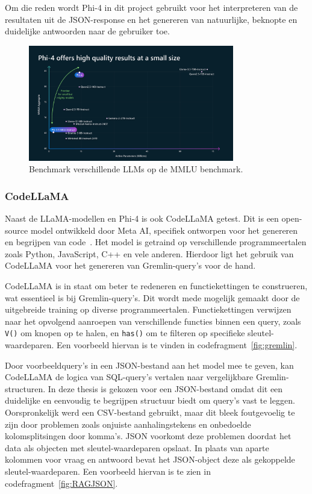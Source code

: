 Om die reden wordt Phi-4 in dit project gebruikt voor het interpreteren van de resultaten uit de JSON-response en het genereren van natuurlijke, beknopte en duidelijke antwoorden naar de gebruiker toe.

\begin{figure}[H]
     \centering
     \includegraphics[width=0.8\textwidth]{./img/MMLU.png}
     \caption[benchmark LLMs.]{\label{fig:MMLU}Benchmark verschillende LLMs op de MMLU benchmark.}
\end{figure}

\subsubsection{CodeLLaMA}
Naast de LLaMA-modellen en Phi-4 is ook CodeLLaMA getest. Dit is een open-source model ontwikkeld door Meta AI, specifiek ontworpen voor het genereren en begrijpen van code~\autocite{codellama}. 
Het model is getraind op verschillende programmeertalen zoals Python, JavaScript, C++ en vele anderen. Hierdoor ligt het gebruik van CodeLLaMA voor het genereren van Gremlin-query's voor de hand.

CodeLLaMA is in staat om beter te redeneren en functiekettingen te construeren, wat essentieel is bij Gremlin-query's. Dit wordt mede mogelijk gemaakt door de uitgebreide training op diverse programmeertalen. 
Functiekettingen verwijzen naar het opvolgend aanroepen van verschillende functies binnen een query, zoals \texttt{V()} om knopen op te halen, en \texttt{has()} om te filteren op specifieke sleutel-waardeparen. 
Een voorbeeld hiervan is te vinden in codefragment~\ref{fig:gremlin}.

Door voorbeeldquery's in een JSON-bestand aan het model mee te geven, kan CodeLLaMA de logica van SQL-query's vertalen naar vergelijkbare Gremlin-structuren. 
In deze thesis is gekozen voor een JSON-bestand omdat dit een duidelijke en eenvoudig te begrijpen structuur biedt om query's vast te leggen. 
Oorspronkelijk werd een CSV-bestand gebruikt, maar dit bleek foutgevoelig te zijn door problemen zoals onjuiste aanhalingstekens en onbedoelde kolomsplitsingen door komma's.
JSON voorkomt deze problemen doordat het data als objecten met sleutel-waardeparen opslaat. 
In plaats van aparte kolommen voor vraag en antwoord bevat het JSON-object deze als gekoppelde sleutel-waardeparen. 
Een voorbeeld hiervan is te zien in codefragment~\ref{fig:RAGJSON}.

